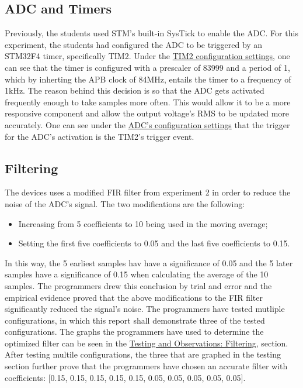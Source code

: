 \documentclass[12pt]{report}
\begin{document}
\subsection{ADC and Timers}
Previously, the students used STM's built-in SysTick to enable the ADC. For this experiment, the
students had configured the ADC to be triggered by an STM32F4 timer, specifically TIM2. Under the
\hyperref[appendixtim2]{TIM2 configuration settings}, one can see that the timer is configured with
a prescaler of 83999 and a period of 1, which by inherting the APB clock of 84MHz, entails the timer
to a frequency of 1kHz. The reason behind this decision is so that the ADC gets activated frequently enough to take samples more often. This would allow it to be a more responsive component and allow the output voltage's RMS to be updated more accurately. One can see under the \hyperref[appendixadc]{ADC's configuration settings} that the trigger for the ADC's activation is the TIM2's trigger event.

\subsection{Filtering}
The devices uses a modified FIR filter from experiment 2 in order to reduce the noise of the ADC's signal. The two modifications are the following: 
\begin{itemize}
	\item Increasing from 5 coefficients to 10 being used in the moving average;
	\item Setting the first five coefficients to 0.05 and the last five coefficients to 0.15.
\end{itemize}
In this way, the 5 earliest samples hav have a significance of 0.05 and the 5 later samples have a significance of 0.15 when calculating the average of the 10 samples. The programmers drew this conclusion by trial and error and the empirical evidence proved that the above modifications to the FIR filter significantly reduced the signal's noise. The programmers have tested mutliple configurations, in which this report shall demonstrate three of the tested configurations. The graphs the programmers have used to determine the optimized filter can be seen in the  \hyperref[testfiltering]{Testing and Observations: Filtering}, section. After testing multile configurations, the three that are graphed in the testing section further prove that the programmers have chosen an accurate filter with coefficients: [0.15, 0.15, 0.15, 0.15, 0.15, 0.05, 0.05, 0.05, 0.05, 0.05].
\end{document}
